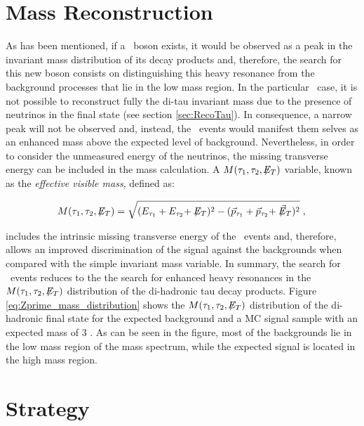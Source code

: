 \section{Mass Reconstruction}
\label{sec:Mass Reconstruction}

As has been mentioned, if a \Zprime~boson exists, it would be observed
as a peak in the invariant mass distribution of its decay products 
and, therefore, the search for this new boson consists on distinguishing this
heavy resonance from the background processes that lie in the low mass region. In the particular 
\Zprimetotautau~case, it is not possible to reconstruct fully the di-tau invariant mass
due to the presence of neutrinos in the final state (see section \ref{sec:RecoTau}). In consequence,
a narrow peak will not be observed and, instead, the \Zprime~events would manifest them selves
as an enhanced mass above the expected level of background. Nevertheless, in order to 
consider the unmeasured energy of the neutrinos, the missing transverse energy can be 
included in the mass calculation. A $M(\tau_1,\tau_2,\not\!\!E_T)$ variable, known as the \textit{effective visible mass},
defined as:

\begin{equation} \label{eq:eff_mass}
M(\tau_1,\tau_2,\not\!\!E_T)  = \sqrt{(E_{\tau_1} + E_{\tau_2} + \not\!\!E_T)^2 - (\vec{p}_{\tau_1} + \vec{p}_{\tau_2} + \not\!\!\vec{E}_T)^2} \;, \\
\end{equation}

\noindent includes the intrinsic missing transverse energy of the \Zprimetotautau~events and, therefore,
allows an improved discrimination of the signal against the backgrounds when compared with 
the simple invariant mass variable. In summary, the search for \Zprimetotauh~events 
reduces to the the search for enhanced heavy resonances in the $M(\tau_1,\tau_2,\not\!\!E_T)$ distribution 
of the di-hadronic tau decay products. Figure \ref{eq:Zprime_mass_distribution}
shows the $M(\tau_1,\tau_2,\not\!\!E_T)$ distribution of the di-hadronic final state
for the expected background and a MC signal sample with an expected mass of 3 \TeV. As can be 
seen in the figure, most of the backgrounds lie in the low mass region of the mass spectrum, while the 
expected signal is located in the high mass region.

\section{Strategy}
\label{sec:Strategy}

